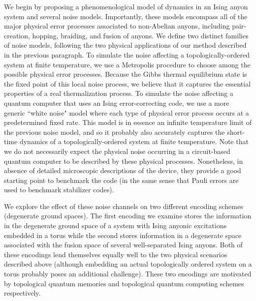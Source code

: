\documentclass[aps, prl, letterpaper, twocolumn, superscriptaddress, notitlepage]{revtex4-1}
\begin{document}
 We begin by proposing a phenomenological model of dynamics in an Ising anyon system and several noise models. Importantly, these models encompass all of the major physical error processes associated to non-Abelian anyons, including pair-creation, hopping, braiding, and fusion of anyons. We define two distinct families of noise models, following the two physical applications of our method described in the previous paragraph. To simulate the noise affecting a topologically-ordered system at finite temperature, we use a Metropolis procedure to choose among the possible physical error processes. Because the Gibbs thermal equilibrium state is the fixed point of this local noise process, we believe that it captures the essential properties of a real thermalization process. To simulate the noise affecting a quantum computer that uses an Ising error-correcting code, we use a more generic ``white noise" model where each type of physical error process occurs at a predetermined fixed rate. This model is in essence an infinite temperature limit of the previous noise model, and so it probably also accurately captures the short-time dynamics of a topologically-ordered system at finite temperature. Note that we do not necessarily expect the physical noise occurring in a circuit-based quantum computer to be described by these physical processes. Nonetheless, in absence of detailed microscopic descriptions of the device, they provide a good starting point to benchmark the code (in the same sense that Pauli errors are used to benchmark stabilizer codes). 

We explore the effect of these noise channels on two different encoding schemes (degenerate ground spaces). The first encoding we examine stores the information in the degenerate ground space of a system with Ising anyonic excitations embedded in a torus while the second stores information in a degenerate space associated with the fusion space of several well-separated Ising anyons. Both of these encodings lend themselves equally well to the two physical scenarios described above (although embedding an actual topologically ordered system on a torus probably poses an additional challenge). These two encodings are motivated by topological quantum memories \cite{Dennis2002} and topological quantum computing \cite{Bravyi2006b,BR07a} schemes respectively. 
\end{document}
